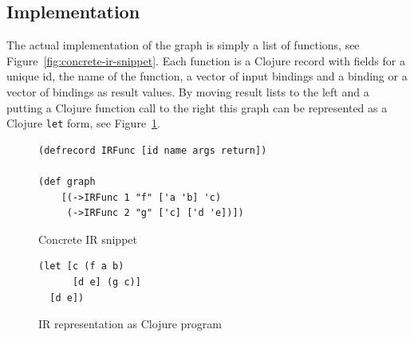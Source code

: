 \subsection{Implementation}

The actual implementation of the graph is simply a list of functions, see Figure~\ref{fig:concrete-ir-snippet}.
Each function is a Clojure record with fields for a unique id, the name of the function, a vector of input bindings and a binding or a vector of bindings as result values.
By moving result lists to the left and a putting a Clojure function call to the right this graph can be represented as a Clojure \texttt{let} form, see Figure~\ref{fig:ir-as-clojure}.

\begin{figure}[h]
\begin{verbatim}
(defrecord IRFunc [id name args return])

(def graph
	[(->IRFunc 1 "f" ['a 'b] 'c)
	 (->IRFunc 2 "g" ['c] ['d 'e])])

\end{verbatim}
\caption{Concrete IR snippet}
\label{fig:concrete-ir-snippet}
\begin{verbatim}
(let [c (f a b)
      [d e] (g c)]
  [d e])
\end{verbatim}
\caption{IR representation as Clojure program}
\label{fig:ir-as-clojure}
\end{figure}

%
%
%
